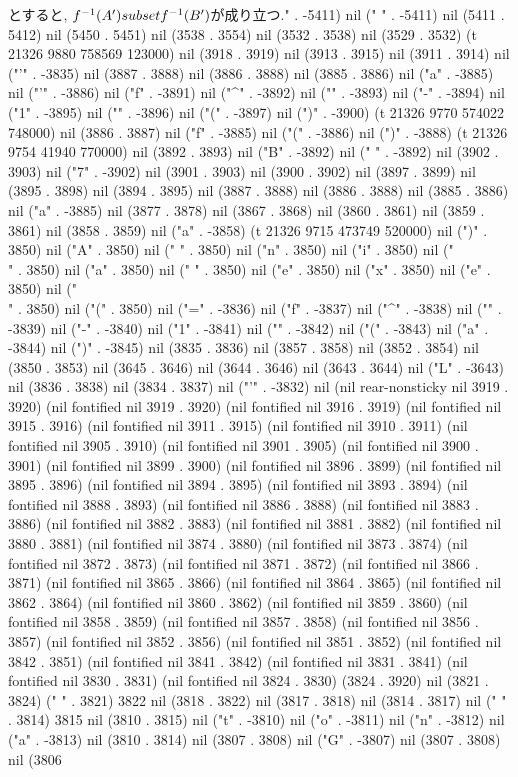    とすると, $f^{-1}(A')\\subset f^{-1}(B')$が成り立つ." . -5411) nil (" " . -5411) nil (5411 . 5412) nil (5450 . 5451) nil (3538 . 3554) nil (3532 . 3538) nil (3529 . 3532) (t 21326 9880 758569 123000) nil (3918 . 3919) nil (3913 . 3915) nil (3911 . 3914) nil ("'" . -3835) nil (3887 . 3888) nil (3886 . 3888) nil (3885 . 3886) nil ("a" . -3885) nil ("'" . -3886) nil ("f" . -3891) nil ("^" . -3892) nil ("{" . -3893) nil ("-" . -3894) nil ("1" . -3895) nil ("}" . -3896) nil ("(" . -3897) nil (")" . -3900) (t 21326 9770 574022 748000) nil (3886 . 3887) nil ("f" . -3885) nil ("(" . -3886) nil (")" . -3888) (t 21326 9754 41940 770000) nil (3892 . 3893) nil ("B" . -3892) nil (" " . -3892) nil (3902 . 3903) nil ("7" . -3902) nil (3901 . 3903) nil (3900 . 3902) nil (3897 . 3899) nil (3895 . 3898) nil (3894 . 3895) nil (3887 . 3888) nil (3886 . 3888) nil (3885 . 3886) nil ("a" . -3885) nil (3877 . 3878) nil (3867 . 3868) nil (3860 . 3861) nil (3859 . 3861) nil (3858 . 3859) nil ("a" . -3858) (t 21326 9715 473749 520000) nil (")" . 3850) nil ("A" . 3850) nil (" " . 3850) nil ("n" . 3850) nil ("i" . 3850) nil ("\\" . 3850) nil ("a" . 3850) nil (" " . 3850) nil ("e" . 3850) nil ("x" . 3850) nil ("e" . 3850) nil ("\\" . 3850) nil ("(" . 3850) nil ("=" . -3836) nil ("f" . -3837) nil ("^" . -3838) nil ("{" . -3839) nil ("-" . -3840) nil ("1" . -3841) nil ("}" . -3842) nil ("(" . -3843) nil ("a" . -3844) nil (")" . -3845) nil (3835 . 3836) nil (3857 . 3858) nil (3852 . 3854) nil (3850 . 3853) nil (3645 . 3646) nil (3644 . 3646) nil (3643 . 3644) nil ("L" . -3643) nil (3836 . 3838) nil (3834 . 3837) nil ("'" . -3832) nil (nil rear-nonsticky nil 3919 . 3920) (nil fontified nil 3919 . 3920) (nil fontified nil 3916 . 3919) (nil fontified nil 3915 . 3916) (nil fontified nil 3911 . 3915) (nil fontified nil 3910 . 3911) (nil fontified nil 3905 . 3910) (nil fontified nil 3901 . 3905) (nil fontified nil 3900 . 3901) (nil fontified nil 3899 . 3900) (nil fontified nil 3896 . 3899) (nil fontified nil 3895 . 3896) (nil fontified nil 3894 . 3895) (nil fontified nil 3893 . 3894) (nil fontified nil 3888 . 3893) (nil fontified nil 3886 . 3888) (nil fontified nil 3883 . 3886) (nil fontified nil 3882 . 3883) (nil fontified nil 3881 . 3882) (nil fontified nil 3880 . 3881) (nil fontified nil 3874 . 3880) (nil fontified nil 3873 . 3874) (nil fontified nil 3872 . 3873) (nil fontified nil 3871 . 3872) (nil fontified nil 3866 . 3871) (nil fontified nil 3865 . 3866) (nil fontified nil 3864 . 3865) (nil fontified nil 3862 . 3864) (nil fontified nil 3860 . 3862) (nil fontified nil 3859 . 3860) (nil fontified nil 3858 . 3859) (nil fontified nil 3857 . 3858) (nil fontified nil 3856 . 3857) (nil fontified nil 3852 . 3856) (nil fontified nil 3851 . 3852) (nil fontified nil 3842 . 3851) (nil fontified nil 3841 . 3842) (nil fontified nil 3831 . 3841) (nil fontified nil 3830 . 3831) (nil fontified nil 3824 . 3830) (3824 . 3920) nil (3821 . 3824) (" " . 3821) 3822 nil (3818 . 3822) nil (3817 . 3818) nil (3814 . 3817) nil (" " . 3814) 3815 nil (3810 . 3815) nil ("t" . -3810) nil ("o" . -3811) nil ("n" . -3812) nil ("a" . -3813) nil (3810 . 3814) nil (3807 . 3808) nil ("G" . -3807) nil (3807 . 3808) nil (3806 